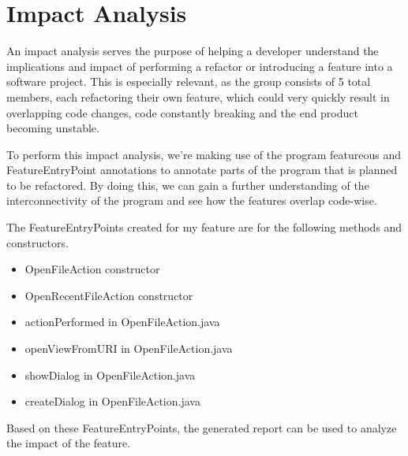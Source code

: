 \section{Impact Analysis}
An impact analysis serves the purpose of helping a developer understand the implications and impact of performing a refactor or introducing a feature into a software project. This is especially relevant, as the group consists of 5 total members, each refactoring their own feature, which could very quickly result in overlapping code changes, code constantly breaking and the end product becoming unstable.

To perform this impact analysis, we're making use of the program featureous and FeatureEntryPoint annotations to annotate parts of the program that is planned to be refactored. By doing this, we can gain a further understanding of the interconnectivity of the program and see how the features overlap code-wise.

The FeatureEntryPoints created for my feature are for the following methods and constructors.

\begin{itemize}
    \item OpenFileAction constructor
    \item OpenRecentFileAction constructor
    \item actionPerformed in OpenFileAction.java
    \item openViewFromURI in OpenFileAction.java
    \item showDialog in OpenFileAction.java
    \item createDialog in OpenFileAction.java
\end{itemize}

Based on these FeatureEntryPoints, the generated report can be used to analyze the impact of the feature.

